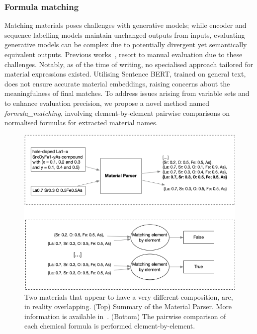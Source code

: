 \documentclass[a4paper]{article}
\begin{document}
\subsubsection{Formula matching}

Matching materials poses challenges with generative models; while encoder and sequence labelling models maintain unchanged outputs from inputs, evaluating generative models can be complex due to potentially divergent yet semantically equivalent outputs. 
Previous works~\cite{taylor2022galactica}, resort to manual evaluation due to these challenges. Notably, as of the time of writing, no specialised approach tailored for material expressions existed. 
Utilising Sentence BERT, trained on general text, does not ensure accurate material embeddings, raising concerns about the meaningfulness of final matches. 
To address issues arising from variable sets and to enhance evaluation precision, we propose a novel method named \textit{formula\_matching}, involving element-by-element pairwise comparisons on normalised formulas for extracted material names.

\begin{figure}[ht]
  \centering
  \includegraphics[width=1\textwidth]{figures/formula-matching-schema.png} 
  \caption{Two materials that appear to have a very different composition, are, in reality overlapping. (Top) Summary of the Material Parser. More information is available in~\cite{lfoppiano2023automatic}. (Bottom) The pairwise comparison of each chemical formula is performed element-by-element.  }
  \label{fig:formula-matching-schema}
\end{figure}
\end{document}
